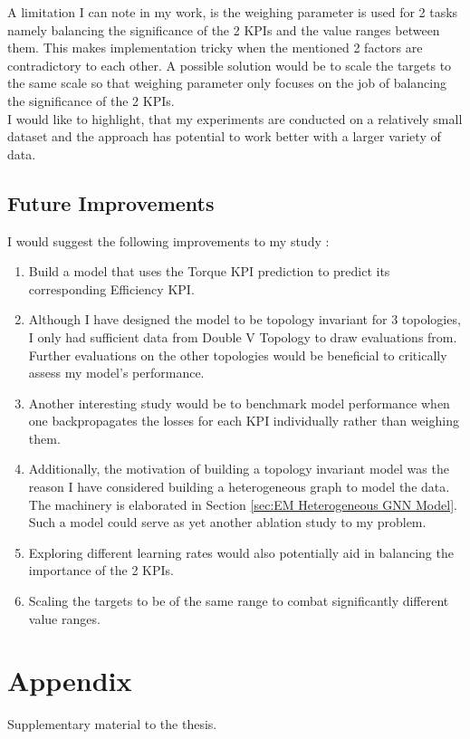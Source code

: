 \documentclass{report} %
\begin{document}
A limitation I can note in my work, is the weighing parameter is used for 2 tasks namely balancing the significance of the 2 \ac{KPI}s and the value ranges between them. 
This makes implementation tricky when the mentioned 2 factors are contradictory to each other. A possible solution would be to scale the targets to the same scale so 
that weighing parameter only focuses on the job of balancing the significance of the 2 \ac{KPI}s.\\
I would like to highlight, that my experiments are conducted on a relatively small dataset and the approach has potential to work better with a larger variety of data.

\section{Future Improvements}\label{sec:Future Improvements}
I would suggest the following improvements to my study : 

\begin{enumerate}[nosep]
    \item Build a model that uses the Torque \ac{KPI} prediction to predict its corresponding Efficiency \ac{KPI}. 
    \item Although I have designed the model to be topology invariant for 3 topologies, I only had sufficient data from Double V Topology to draw evaluations from.
    Further evaluations on the other topologies would be beneficial to critically assess my model's performance.
    \item Another interesting study would be to benchmark model performance when one backpropagates the losses for each \ac{KPI} individually rather than weighing them.
    \item Additionally, the motivation of building a topology invariant model was the reason I have considered building a heterogeneous graph to model the data. The machinery is elaborated in Section \ref{sec:EM Heterogeneous GNN Model}.
    Such a model could serve as yet another ablation study to my problem.
    \item Exploring different learning rates would also potentially aid in balancing the importance of the 2 \ac{KPI}s.
    \item Scaling the targets to be of the same range to combat significantly different value ranges.
\end{enumerate}

\newpage 

\appendix
\chapter{Appendix}
Supplementary material to the thesis.
\end{document}
